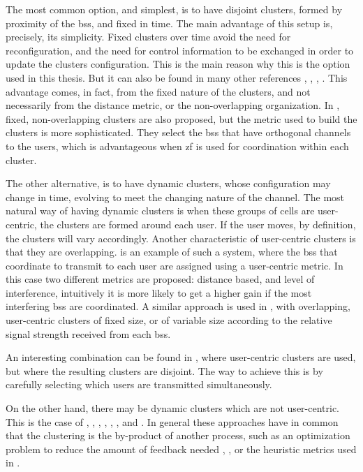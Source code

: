The most common option, and simplest, is to have disjoint clusters, formed by
proximity of the \glspl{bs}, and fixed in time. The main advantage of this setup
is, precisely, its simplicity. Fixed clusters over time avoid the need for
reconfiguration, and the need for control information to be exchanged in order
to update the clusters configuration. This is the main reason why this is the
option used in this thesis. But it can also be found in many other references
\cite{zhang09}, \cite{huang09}, \cite{ramprashad10}, \cite{hosseini13}. This
advantage comes, in fact, from the fixed nature of the clusters, and not
necessarily from the distance metric, or the non-overlapping organization. In
\cite{swannack05}, fixed, non-overlapping clusters are also proposed, but the
metric used to build the clusters is more sophisticated. They select the
\glspl{bs} that have orthogonal channels to the users, which is advantageous
when \gls{zf} is used for coordination within each cluster.

The other alternative, is to have dynamic clusters, whose configuration may
change in time, evolving to meet the changing nature of the channel. The most
natural way of having dynamic clusters is when these groups of cells are
user-centric, \ie the clusters are formed around each user. If the user moves,
by definition, the clusters will vary accordingly. Another characteristic of
user-centric clusters is that they are overlapping. \cite{ng10} is an example of
such a system, where the \glspl{bs} that coordinate to transmit to each user are
assigned using a user-centric metric. In this case two different metrics are
proposed: distance based, and level of interference, intuitively it is more
likely to get a higher gain if the most interfering \glspl{bs} are coordinated.
A similar approach is used in \cite{gong11}, with overlapping, user-centric
clusters of fixed size, or of variable size according to the relative signal
strength received from each \glspl{bs}.

An interesting combination can be found in \cite{baracca12}, where user-centric
clusters are used, but where the resulting clusters are disjoint. The way to
achieve this is by carefully selecting which users are transmitted
simultaneously.

On the other hand, there may be dynamic clusters which are not user-centric.
This is the case of \cite{papadogiannis08}, \cite{papadogiannis10},
\cite{papadogiannis11}, \cite{moon11}, \cite{cui11}, \cite{lakshmana12}, and
\cite{mingyi13}. In general these approaches have in common that the clustering
is the by-product of another process, such as an optimization problem to reduce
the amount of feedback needed \cite{papadogiannis11}, \cite{lakshmana12}, or the
heuristic metrics used in \cite{moon11}.

